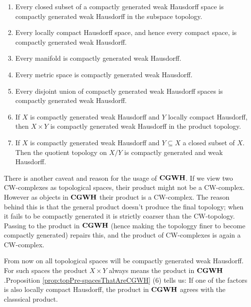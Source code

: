 \begin{proposition}\label{prop:topPre-spacesThatAreCGWH}
\begin{enumerate}
    \item Every closed subset of a compactly generated weak Hausdorff space is compactly generated weak Hausdorff in the subspace topology.
    \item Every locally compact Hausdorff space, and hence every compact space, is compactly generated weak Hausdorff.
	\item Every manifold is compactly generated weak Hausdorff.
	\item Every metric space is compactly generated weak Hausdorff.
    \item Every disjoint union of compactly generated weak Hausdorff spaces is compactly generated weak Hausdorff.
    \item If $X$ is compactly generated weak Hausdorff and $Y$ locally compact Hausdorff, then $X\times Y$ is compactly generated weak Hausdorff in the product topology.
    \item If $X$ is compactly generated weak Hausdorff and $Y\subseteq X$ a closed subset of $X$. Then the quotient topology on $X\big/ Y$ is compactly generated and weak Hausdorff.
\end{enumerate}

\end{proposition}
There is another caveat and reason for the usage of $\operatorname{\mathbf{CGWH}}$. If we view two CW-complexes as topological spaces, their product might not be a CW-complex. However as objects in $\operatorname{\mathbf{CGWH}}$ their product is a CW-complex. The reason behind this is that the general product doesn't produce the final topology; when it fails to be compactly generated it is strictly coarser than the CW-topology. Passing to the product in $\operatorname{\mathbf{CGWH}}$ (hence making the topologgy finer to become compactly generated) repairs this, and the product of CW-complexes is again a CW-complex.
\begin{remark}
    From now on all topological spaces will be compactly generated weak Hausdorff. For such spaces the product $X\times Y$ always means the product in $\operatorname{\mathbf{CGWH}}$.Proposition \ref{prop:topPre-spacesThatAreCGWH} (6) tells us: If one of the factors is also locally compact Hausdorff, the product in $\operatorname{\mathbf{CGWH}}$ agrees with the classsical product.
\end{remark}

